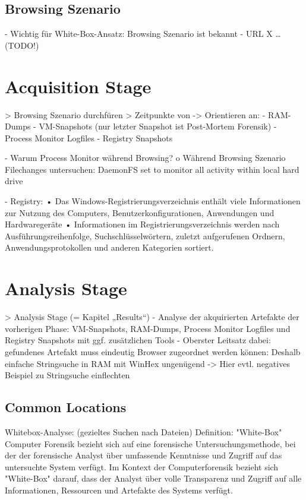 \subsection{Browsing Szenario}
- Wichtig für White-Box-Ansatz: Browsing Szenario ist bekannt
- URL X … 	(TODO!)



\section{Acquisition Stage}

> Browsing Szenario durchfüren
> Zeitpunkte von -> Orientieren an: \cite{Muir.2019}
	- RAM-Dumps 
	- VM-Snapshots (nur letzter Snapshot ist Post-Mortem Forensik)
	- Process Monitor Logfiles
	- Registry Snapshots	

- Warum Process Monitor während Browsing?
	o Während Browsing Szenario Filechanges untersuchen: DaemonFS set to monitor all activity within local hard drive\cite{Ohana.2013}
	
- Registry: \cite{Rochmadi.2017}
	•	Das Windows-Registrierungsverzeichnis enthält viele Informationen zur Nutzung des Computers, Benutzerkonfigurationen, Anwendungen und Hardwaregeräte
	•	Informationen im Registrierungsverzeichnis werden nach Ausführungsreihenfolge, Suchschlüsselwörtern, zuletzt aufgerufenen Ordnern, Anwendungsprotokollen und anderen Kategorien sortiert.
	
	

\section{Analysis Stage}

> Analysis Stage (= Kapitel „Results“)
- Analyse der akquirierten Artefakte der vorherigen Phase: VM-Snapshots, RAM-Dumps, Process Monitor Logfiles und Registry Snapshots mit ggf. zusätzlichen Tools
- Oberster Leitsatz dabei: gefundenes Artefakt muss eindeutig Browser zugeordnet werden können: Deshalb einfache Stringsuche in RAM mit WinHex ungenügend -> Hier evtl. negatives Beispiel zu Stringsuche einflechten

\subsection{Common Locations}

Whitebox-Analyse: (gezieltes Suchen nach Dateien) \cite{Bonetti.2014}
	Definition: "White-Box" Computer Forensik bezieht sich auf eine forensische Untersuchungsmethode, bei der der forensische Analyst über umfassende Kenntnisse und Zugriff auf das untersuchte System verfügt. Im Kontext der Computerforensik bezieht sich "White-Box" darauf, dass der Analyst über volle Transparenz und Zugriff auf alle Informationen, Ressourcen und Artefakte des Systems verfügt.
	
